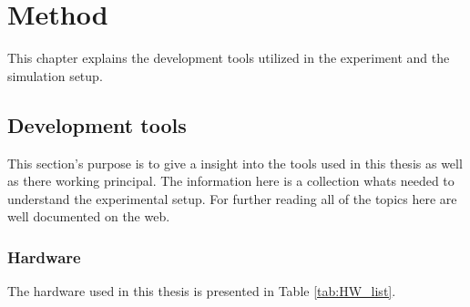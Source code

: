 \chapter{Method} %

This chapter explains the development tools utilized in the experiment and the simulation setup.



\section{Development tools}
This section's purpose is to give a insight into the tools used in this thesis as well as there working principal. The information here is a collection whats needed to understand the experimental setup. For further reading all of the topics here are well documented on the web. 
 

\subsection{Hardware}

The hardware used in this thesis is presented in Table \ref{tab:HW_list}.

